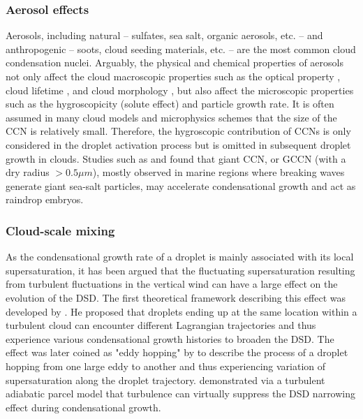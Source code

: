 \subsubsection{Aerosol effects}

Aerosols, including natural -- sulfates, sea salt, organic aerosols, etc. -- and anthropogenic -- soots, cloud seeding materials, etc. -- are the most common cloud condensation nuclei. Arguably, the physical and chemical properties of aerosols not only affect the cloud macroscopic properties such as the optical property \citep{Twomey1959}, cloud lifetime \citep{Albrecht1989, Small2009}, and cloud morphology \citep{Jiang2009}, but also affect the microscopic properties such as the hygroscopicity (solute effect) and particle growth rate. It is often assumed in many cloud models and microphysics schemes \citep[e.g., ][]{Morrison2005, Thompson2014} that the size of the CCN is relatively small. Therefore, the hygroscopic contribution of CCNs is only considered in the droplet activation process but is omitted in subsequent droplet growth in clouds. Studies such as \citet{Jensen2017} and \citet{blyth2003} found that giant CCN, or GCCN (with a dry radius $> 0.5 \mu m$), mostly observed in marine regions where breaking waves generate giant sea-salt particles, may accelerate condensational growth and act as raindrop embryos.

\subsubsection{Cloud-scale mixing}

As the condensational growth rate of a droplet is mainly associated with its local supersaturation, it has been argued that the fluctuating supersaturation resulting from turbulent fluctuations in the vertical wind can have a large effect on the evolution of the DSD. The first theoretical framework describing this effect was developed by \citet{cooper1989}. He proposed that droplets ending up at the same location within a turbulent cloud can encounter different Lagrangian trajectories and thus experience various condensational growth histories to broaden the DSD. The effect was later coined as "eddy hopping" by \citet{Grabowski2013} to describe the process of a droplet hopping from one large eddy to another and thus experiencing variation of supersaturation along the droplet trajectory. \citet{grabowski2017} demonstrated via a turbulent adiabatic parcel model that turbulence can virtually suppress the DSD narrowing effect during condensational growth. 

